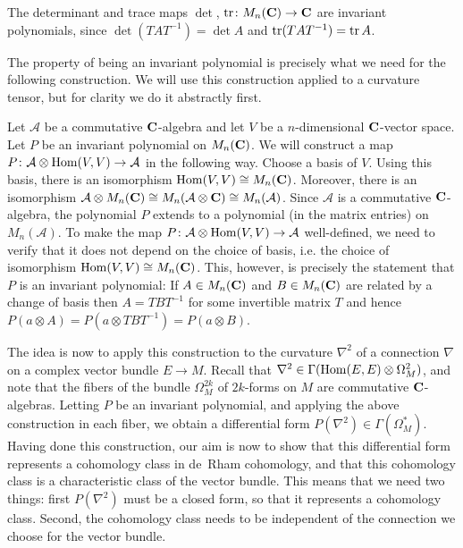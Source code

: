 \documentclass[a4paper,openany]{scrbook}
\begin{document}
\begin{example}
The determinant and trace maps $\det$, $\operatorname{tr} \colon M_n(\mathbf C) \to \mathbf C$ are invariant polynomials, since $\det(TAT^{-1}) = \det A$ and $\operatorname{tr}(TAT^{-1}) = \operatorname{tr} A$.
\end{example}

The property of being an invariant polynomial is precisely what we need for the following construction. We will use this construction applied to a curvature tensor, but for clarity we do it abstractly first.

\begin{construction}
Let $\mathcal A$ be a commutative $\mathbf C$-algebra and let $V$ be a $n$-dimensional $\mathbf C$-vector space. Let $P$ be an invariant polynomial on $M_n(\mathbf C)$. We will construct a map $P \colon \mathcal A \otimes \operatorname{Hom}(V, V) \to \mathcal A$ in the following way. Choose a basis of $V$. Using this basis, there is an isomorphism $\operatorname{Hom}(V, V) \cong M_n(\mathbf C)$. Moreover, there is an isomorphism $\mathcal A \otimes M_n(\mathbf C) \cong M_n(\mathcal A \otimes \mathbf C) \cong M_n(\mathcal A)$. Since $\mathcal A$ is a commutative $\mathbf C$-algebra, the polynomial $P$ extends to a polynomial (in the matrix entries) on $M_n(\mathcal A)$. To make the map $P \colon \mathcal A \otimes \operatorname{Hom}(V, V) \to \mathcal A$ well-defined, we need to verify that it does not depend on the choice of basis, i.e. the choice of isomorphism $\operatorname{Hom}(V, V) \cong M_n(\mathbf C)$. This, however, is precisely the statement that $P$ is an invariant polynomial: If $A \in M_n(\mathbf C)$ and $B \in M_n(\mathbf C)$ are related by a change of basis then $A = TBT^{-1}$ for some invertible matrix $T$ and hence $P(a \otimes A) = P(a \otimes TBT^{-1}) = P(a \otimes B)$.
\end{construction}

The idea is now to apply this construction to the curvature $\nabla^2$ of a connection $\nabla$ on a complex vector bundle $E \to M$. Recall that $\nabla^2 \in \Gamma(\operatorname{Hom}(E, E) \otimes \Omega^2_M)$, and note that the fibers of the bundle $\Omega^{2k}_M$ of $2k$-forms on $M$ are commutative $\mathbf C$-algebras. Letting $P$ be an invariant polynomial, and applying the above construction in each fiber, we obtain a differential form $P(\nabla^2) \in \Gamma(\Omega^*_M)$. Having done this construction, our aim is now to show that this differential form represents a cohomology class in de~Rham cohomology, and that this cohomology class is a characteristic class of the vector bundle. This means that we need two things: first $P(\nabla^2)$ must be a closed form, so that it represents a cohomology class. Second, the cohomology class needs to be independent of the connection we choose for the vector bundle.
\end{document}

